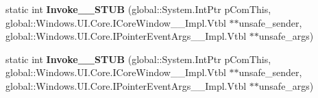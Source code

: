 \begin{DoxyCompactItemize}
static int {\bfseries Invoke\+\_\+\+\_\+\+S\+T\+UB} (global\+::\+System.\+Int\+Ptr p\+Com\+This, global\+::\+Windows.\+U\+I.\+Core.\+I\+Core\+Window\+\_\+\+\_\+\+Impl.\+Vtbl $\ast$$\ast$unsafe\+\_\+sender, global\+::\+Windows.\+U\+I.\+Core.\+I\+Pointer\+Event\+Args\+\_\+\+\_\+\+Impl.\+Vtbl $\ast$$\ast$unsafe\+\_\+args)
\item 
\mbox{\label{struct_windows_1_1_foundation_1_1_typed_event_handler___a___windows___u_i___core___core_window__9847d8e12b1e96286fbe9b33a69b897e_a8f98ff3b905a0f9cb4059eeef7b90f76}} 
static int {\bfseries Invoke\+\_\+\+\_\+\+S\+T\+UB} (global\+::\+System.\+Int\+Ptr p\+Com\+This, global\+::\+Windows.\+U\+I.\+Core.\+I\+Core\+Window\+\_\+\+\_\+\+Impl.\+Vtbl $\ast$$\ast$unsafe\+\_\+sender, global\+::\+Windows.\+U\+I.\+Core.\+I\+Pointer\+Event\+Args\+\_\+\+\_\+\+Impl.\+Vtbl $\ast$$\ast$unsafe\+\_\+args)
\end{DoxyCompactItemize}
